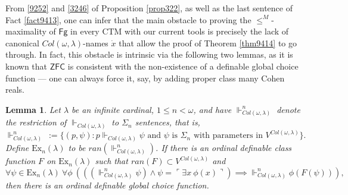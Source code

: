 \documentclass[12pt, twoside]{memoir}
\numberwithin{equation}{section}
\newtheorem{lem}[thm]{Lemma}
\theoremstyle{definition}
\theoremstyle{remark}
\theoremstyle{definition}
\theoremstyle{definition}
\theoremstyle{definition}
\theoremstyle{remark}
\begin{document}
From \ref{9252} and \ref{3246} of Proposition \ref{prop322}, as well as the last sentence of Fact \ref{fact9413}, one can infer that the main obstacle to proving the $\leq^M$-maximality of $\mathsf{Fg}$ in every CTM with our current tools is precisely the lack of canonical $Col(\omega, \lambda)$-names $\dot{x}$ that allow the proof of Theorem \ref{thm9414} to go through. In fact, this obstacle is intrinsic via the following two lemmas, as it is known that $\mathsf{ZFC}$ is consistent with the non-existence of a definable global choice function --- one can always force it, say, by adding proper class many Cohen reals.

\begin{lem}\label{lem9419}
Let $\lambda$ be an infinite cardinal, $1 \leq n < \omega$, and have $\Vdash^n_{Col(\omega, \lambda)}$ denote the restriction of $\Vdash_{Col(\omega, \lambda)}$ to $\Sigma_n$ sentences, that is,
\begin{equation*}
    \Vdash^n_{Col(\omega, \lambda)} \ := \{(p, \psi) : p \Vdash_{Col(\omega, \lambda)} \psi \text{ and } \psi \text{ is } \Sigma_n \text{ with parameters in } V^{Col(\omega, \lambda)}\} \text{.}
\end{equation*}
Define $\mathrm{Ex}_n(\lambda)$ to be $ran(\Vdash^n_{Col(\omega, \lambda)})$. If there is an ordinal definable class function $F$ on $\mathrm{Ex}_n(\lambda)$ such that $ran(F) \subset V^{Col(\omega, \lambda)}$ and 
\begin{equation}\label{eq943}
    \forall \psi \in \mathrm{Ex}_n(\lambda) \ \forall \phi \ (((\Vdash^n_{Col(\omega, \lambda)} \psi) \wedge \psi = \ulcorner \exists x \ \phi(x) \urcorner) \implies \Vdash^n_{Col(\omega, \lambda)} \phi(F(\psi))) \text{,}
\end{equation}
then there is an ordinal definable global choice function.
\end{lem}
\end{document}

